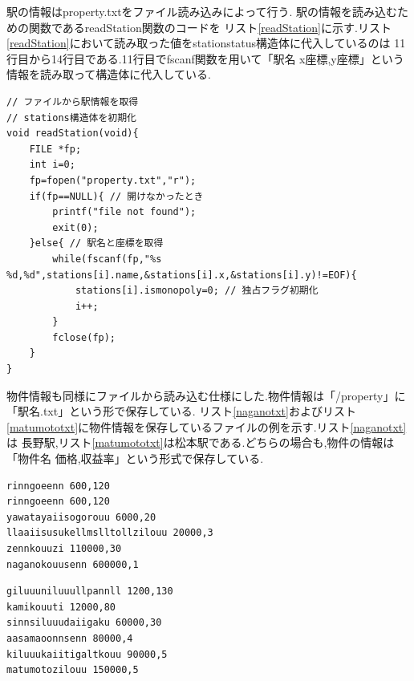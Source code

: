 \documentclass[a4j]{jarticle}
\begin{document}
    駅の情報はproperty.txtをファイル読み込みによって行う. 駅の情報を読み込むための関数であるreadStation関数のコードを
    リスト\ref{readStation}に示す.リスト\ref{readStation}において読み取った値をstationstatus構造体に代入しているのは
    11行目から14行目である.11行目でfscanf関数を用いて「駅名 x座標,y座標」という情報を読み取って構造体に代入している.
    \begin{lstlisting}[basicstyle=\ttfamily\footnotesize, frame=single,label=readStation,caption=readStation関数のコード]
// ファイルから駅情報を取得
// stations構造体を初期化
void readStation(void){
    FILE *fp;
    int i=0;
    fp=fopen("property.txt","r");
    if(fp==NULL){ // 開けなかったとき
        printf("file not found");
        exit(0);
    }else{ // 駅名と座標を取得
        while(fscanf(fp,"%s %d,%d",stations[i].name,&stations[i].x,&stations[i].y)!=EOF){
            stations[i].ismonopoly=0; // 独占フラグ初期化
            i++;
        }
        fclose(fp);
    }
}
        \end{lstlisting}      

    物件情報も同様にファイルから読み込む仕様にした.物件情報は「/property」に「駅名.txt」という形で保存している.
    リスト\ref{naganotxt}およびリスト\ref{matumototxt}に物件情報を保存しているファイルの例を示す.リスト\ref{naganotxt}は
    長野駅,リスト\ref{matumototxt}は松本駅である.どちらの場合も,物件の情報は「物件名 価格,収益率」という形式で保存している.
    \begin{lstlisting}[basicstyle=\ttfamily\footnotesize, frame=single,label=naganotxt,caption=/property/nagano.txt]
rinngoeenn 600,120
rinngoeenn 600,120
yawatayaiisogorouu 6000,20 
llaaiisusukellmslltollzilouu 20000,3 
zennkouuzi 110000,30
naganokouusenn 600000,1
    \end{lstlisting}  

    \begin{lstlisting}[basicstyle=\ttfamily\footnotesize, frame=single,label=matumototxt,caption=/property/matumoto.txt]
giluuuniluuullpannll 1200,130 
kamikouuti 12000,80
sinnsiluuudaiigaku 60000,30
aasamaoonnsenn 80000,4
kiluuukaiitigaltkouu 90000,5
matumotozilouu 150000,5
    \end{lstlisting}     
\end{document}

